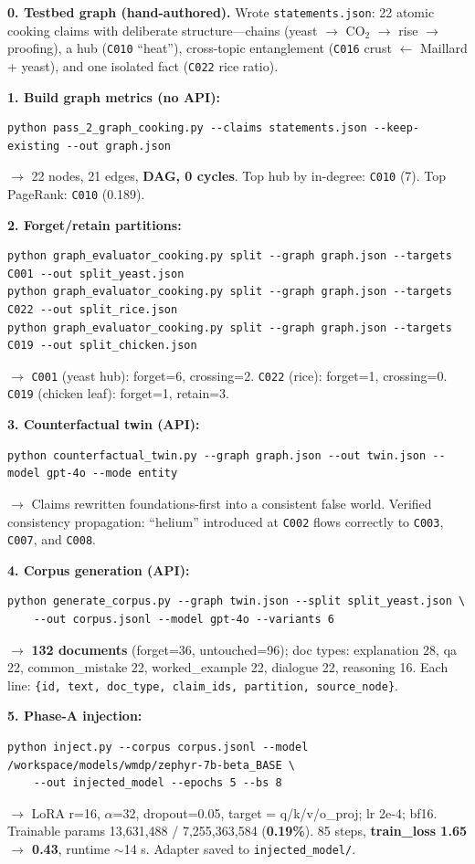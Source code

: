 \documentclass[11pt]{article}
\newcommand{\code}[1]{\texttt{#1}}
\begin{document}
\textbf{0. Testbed graph (hand-authored).} Wrote \texttt{statements.json}: 22 atomic cooking claims
with deliberate structure---chains (yeast $\rightarrow$ CO$_2$ $\rightarrow$ rise $\rightarrow$ proofing),
a hub (\texttt{C010} ``heat''), cross-topic entanglement
(\texttt{C016} crust $\leftarrow$ Maillard + yeast), and one isolated fact
(\texttt{C022} rice ratio).

\textbf{1. Build graph metrics (no API):}
\begin{lstlisting}
python pass_2_graph_cooking.py --claims statements.json --keep-existing --out graph.json
\end{lstlisting}
$\rightarrow$ 22 nodes, 21 edges, \textbf{DAG, 0 cycles}. Top hub by in-degree:
\texttt{C010} (7). Top PageRank: \texttt{C010} (0.189).

\textbf{2. Forget/retain partitions:}
\begin{lstlisting}
python graph_evaluator_cooking.py split --graph graph.json --targets C001 --out split_yeast.json
python graph_evaluator_cooking.py split --graph graph.json --targets C022 --out split_rice.json
python graph_evaluator_cooking.py split --graph graph.json --targets C019 --out split_chicken.json
\end{lstlisting}
$\rightarrow$ \texttt{C001} (yeast hub): forget=6, crossing=2. \texttt{C022} (rice):
forget=1, crossing=0. \texttt{C019} (chicken leaf): forget=1, retain=3.

\textbf{3. Counterfactual twin (API):}
\begin{lstlisting}
python counterfactual_twin.py --graph graph.json --out twin.json --model gpt-4o --mode entity
\end{lstlisting}
$\rightarrow$ Claims rewritten foundations-first into a consistent false world. Verified
consistency propagation: ``helium'' introduced at \texttt{C002} flows correctly to
\texttt{C003}, \texttt{C007}, and \texttt{C008}.

\textbf{4. Corpus generation (API):}
\begin{lstlisting}
python generate_corpus.py --graph twin.json --split split_yeast.json \
    --out corpus.jsonl --model gpt-4o --variants 6
\end{lstlisting}
$\rightarrow$ \textbf{132 documents} (forget=36, untouched=96); doc types:
explanation 28, qa 22, common\_mistake 22, worked\_example 22, dialogue 22,
reasoning 16. Each line:
\texttt{\{id, text, doc\_type, claim\_ids, partition, source\_node\}}.

\textbf{5. Phase-A injection:}
\begin{lstlisting}
python inject.py --corpus corpus.jsonl --model /workspace/models/wmdp/zephyr-7b-beta_BASE \
    --out injected_model --epochs 5 --bs 8
\end{lstlisting}
$\rightarrow$ LoRA r=16, $\alpha$=32, dropout=0.05, target = q/k/v/o\_proj; lr 2e-4; bf16.
Trainable params 13{,}631{,}488 / 7{,}255{,}363{,}584 (\textbf{0.19\%}). 85 steps,
\textbf{train\_loss 1.65 $\rightarrow$ 0.43}, runtime $\sim$14 s. Adapter saved to
\code{injected\_model/}.
\end{document}
